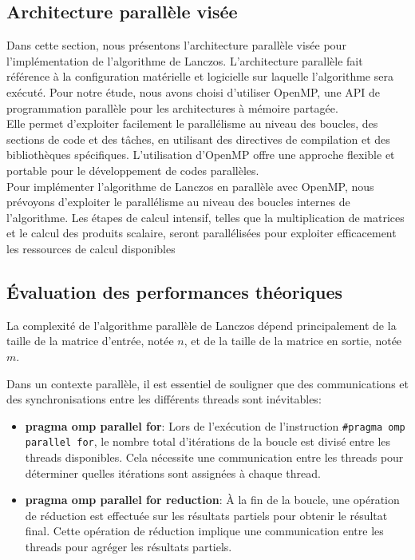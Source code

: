 \documentclass[11pt,french]{article}
\begin{document}
	\newpage
    \subsection{Architecture parallèle visée}
    Dans cette section, nous présentons l'architecture parallèle visée pour l'implémentation de l'algorithme de Lanczos. L'architecture parallèle fait référence à la configuration matérielle et logicielle sur laquelle l'algorithme sera exécuté. Pour notre étude, nous avons choisi d'utiliser OpenMP, une API de programmation parallèle pour les architectures à mémoire partagée. \\
    
    Elle permet d'exploiter facilement le parallélisme au niveau des boucles, des sections de code et des tâches, en utilisant des directives de compilation et des bibliothèques spécifiques. L'utilisation d'OpenMP offre une approche flexible et portable pour le développement de codes parallèles. \\
    
    Pour implémenter l'algorithme de Lanczos en parallèle avec OpenMP, nous prévoyons d'exploiter le parallélisme au niveau des boucles internes de l'algorithme. Les étapes de calcul intensif, telles que la multiplication de matrices et le calcul des produits scalaire, seront parallélisées pour exploiter efficacement les ressources de calcul disponibles
    
    \newpage
	
	\subsection{Évaluation des performances théoriques}
	La complexité de l'algorithme parallèle de Lanczos dépend principalement de la taille de la matrice d'entrée, notée $n$, et de la taille de la matrice en sortie, notée $m$.

    Dans un contexte parallèle, il est essentiel de souligner que des communications et des synchronisations entre les différents threads sont inévitables: \\
    \begin{itemize}
    \item \textbf{pragma omp parallel for}:  Lors de l'exécution de l'instruction \texttt{\#pragma omp parallel for}, le nombre total d'itérations de la boucle est divisé entre les threads disponibles. Cela nécessite une communication entre les threads pour déterminer quelles itérations sont assignées à chaque thread. \\
    
    \item \textbf{pragma omp parallel for reduction}:  À la fin de la boucle, une opération de réduction est effectuée sur les résultats partiels pour obtenir le résultat final. Cette opération de réduction implique une communication entre les threads pour agréger les résultats partiels.
	\end{itemize}
\end{document}
